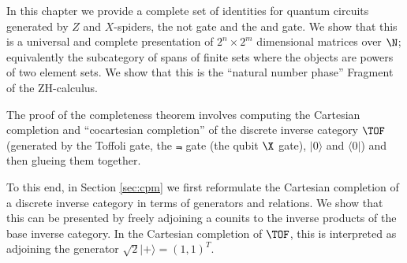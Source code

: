 In this chapter we provide a complete set of identities for quantum circuits generated by $Z$ and $X$-spiders, the not gate and the {\sf and} gate. We show that this is a universal and complete presentation of $2^n \times 2^m$ dimensional matrices over $\N$; equivalently the subcategory of spans of finite sets where the objects are powers of two element sets. We show that this is the ``natural number phase'' Fragment of the ZH-calculus.



The proof of the completeness theorem involves computing the Cartesian completion and ``cocartesian completion'' of the discrete inverse category $\TOF$ (generated by the Toffoli gate, the $\Not$ gate (the qubit $\mathcal \X$ gate),  $|0\rangle$ and $\langle 0|$) and then glueing them together.

To this end, in Section \ref{sec:cpm} we first reformulate the Cartesian completion of a discrete inverse category in terms of generators and relations.  We show that this can be presented by freely adjoining a counits to the inverse products of the base inverse category.   In the Cartesian completion of $\TOF$, this is interpreted as adjoining the generator $\sqrt 2 | + \rangle=(1,1)^T$.


